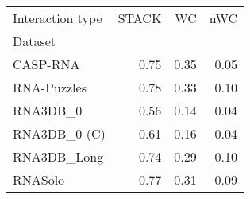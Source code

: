 \begin{tabular}{lrrr}
\toprule
Interaction type & STACK & WC & nWC \\
Dataset &  &  &  \\
\midrule
CASP-RNA & 0.75 & 0.35 & 0.05 \\
RNA-Puzzles & 0.78 & 0.33 & 0.10 \\
RNA3DB_0 & 0.56 & 0.14 & 0.04 \\
RNA3DB_0 (C) & 0.61 & 0.16 & 0.04 \\
RNA3DB_Long & 0.74 & 0.29 & 0.10 \\
RNASolo & 0.77 & 0.31 & 0.09 \\
\bottomrule
\end{tabular}

